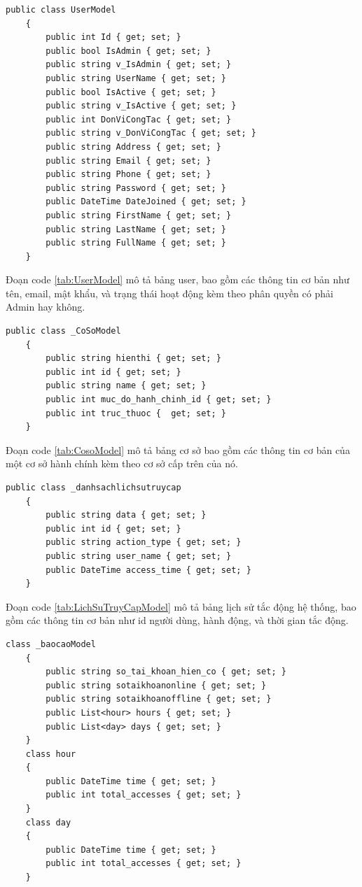 \documentclass{article} %
\begin{document}
\begin{lstlisting}[caption={UserModel Class Definition}, label={tab:UserModel}]   
    public class UserModel
    {
        public int Id { get; set; }  
        public bool IsAdmin { get; set; } 
        public string v_IsAdmin { get; set; }
        public string UserName { get; set; }  
        public bool IsActive { get; set; } 
        public string v_IsActive { get; set; } 
        public int DonViCongTac { get; set; }  
        public string v_DonViCongTac { get; set; }  
        public string Address { get; set; }  
        public string Email { get; set; }  
        public string Phone { get; set; }  
        public string Password { get; set; }  
        public DateTime DateJoined { get; set; }  
        public string FirstName { get; set; }  
        public string LastName { get; set; }  
        public string FullName { get; set; }  
    }
\end{lstlisting}

Đoạn code \ref{tab:UserModel} mô tả bảng user, bao gồm các thông tin cơ bản như tên, email, mật khẩu, và trạng thái hoạt động kèm theo phân quyền có phải Admin hay không.

\begin{lstlisting}[caption={CoSo Class Definition}, label={tab:CosoModel}]   
    public class _CoSoModel
    {
        public string hienthi { get; set; }
        public int id { get; set; }
        public string name { get; set; }   
        public int muc_do_hanh_chinh_id { get; set; }
        public int truc_thuoc {  get; set; }
    }
\end{lstlisting}

Đoạn code \ref{tab:CosoModel} mô tả bảng cơ sở bao gồm các thông tin cơ bản của một cơ sở hành chính kèm theo cơ sở cấp trên của nó.

\begin{lstlisting}[caption={LichSuTruyCap Class Definition}, label={tab:LichSuTruyCapModel}]   
    public class _danhsachlichsutruycap
    {
        public string data { get; set; }
        public int id { get; set; }
        public string action_type { get; set; }
        public string user_name { get; set; }
        public DateTime access_time { get; set; }
    }
\end{lstlisting}

Đoạn code \ref{tab:LichSuTruyCapModel} mô tả bảng lịch sử tắc động hệ thống, bao gồm các thông tin cơ bản như id người dùng, hành động, và thời gian tắc động.

\begin{lstlisting}[caption={BaoCao Class Definition}, label={tab:BaoCaoModel}]   
    class _baocaoModel
    {
        public string so_tai_khoan_hien_co { get; set; }
        public string sotaikhoanonline { get; set; }
        public string sotaikhoanoffline { get; set; }
        public List<hour> hours { get; set; }
        public List<day> days { get; set; }
    }
    class hour
    {
        public DateTime time { get; set; }
        public int total_accesses { get; set; }
    }
    class day
    {
        public DateTime time { get; set; }
        public int total_accesses { get; set; }
    }
\end{lstlisting}
\end{document}
